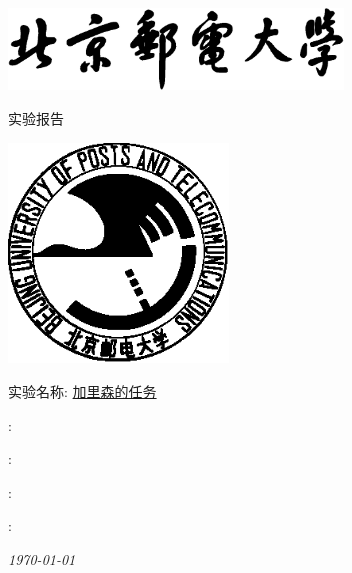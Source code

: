 \begin{titlepage}
    \center
    \includegraphics[width=3.5in]{images/buptname.eps}

    \begin{spacing}{5}
        {\bigsize 实验报告}
    \end{spacing}

    \includegraphics[width=2.3in]{images/buptseal.eps}

    \begin{spacing}{1}
        \vspace{2.5cm}
        \Large{实验名称:} \underline{加里森的任务}
        \vspace{3cm}
    \end{spacing}

    \begin{minipage}{0.32\linewidth}
         : \underline{}

         : \underline{}

         : \underline{}

         : \underline{}


    \end{minipage}

    {\small\em \today }
\end{titlepage}

